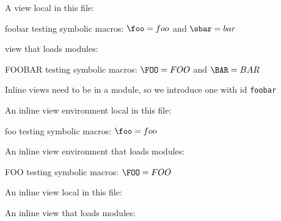 \documentclass[minimal]{omdoc}
\begin{document}
\begin{module}[id=foo]
\end{module}

\begin{module}[id=bar]
\end{module}

A view local in this file:
\begin{view}{foo}{bar}
  testing symbolic macros: $\foo = foo$ and $\sbar=bar$
\end{view}

 view that loads modules:
\begin{view}[loadfrom=FOO,loadto=BAR]{FOO}{BAR}
  testing symbolic macros: $\FOO = FOO$ and $\BAR=BAR$
\end{view}

Inline views need to be in a module, so we introduce one with id \texttt{foobar}

\begin{module}[id=foobar] 
 An inline view environment local in this file:
\begin{inlineView}{foo}
  testing symbolic macros: $\foo = foo$
\end{inlineView}

An inline view environment that loads modules:
\begin{inlineView}[loadfrom=FOO]{FOO}
  testing symbolic macros: $\FOO = FOO$
\end{inlineView}

An inline view local in this file:

An inline view that loads modules: 
\end{module}
\end{document}
